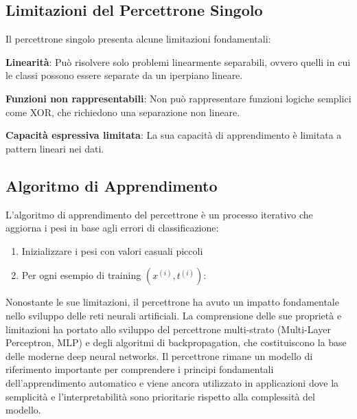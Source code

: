 \subsection{Limitazioni del Percettrone Singolo}
Il percettrone singolo presenta alcune limitazioni fondamentali:
\begin{compactitemize}
\item \textbf{Linearità}: Può risolvere solo problemi linearmente separabili, ovvero quelli in cui le classi possono essere separate da un iperpiano lineare.
\item \textbf{Funzioni non rappresentabili}: Non può rappresentare funzioni logiche semplici come XOR, che richiedono una separazione non lineare.
\item \textbf{Capacità espressiva limitata}: La sua capacità di apprendimento è limitata a pattern lineari nei dati.
\end{compactitemize}


\subsection{Algoritmo di Apprendimento}
L'algoritmo di apprendimento del percettrone è un processo iterativo che aggiorna i pesi in base agli errori di classificazione:
\begin{enumerate}
\item Inizializzare i pesi con valori casuali piccoli
\item Per ogni esempio di training $(x^{(i)}, t^{(i)})$:
\end{enumerate}

Nonostante le sue limitazioni, il percettrone ha avuto un impatto fondamentale nello sviluppo delle reti neurali artificiali. La comprensione delle sue proprietà e limitazioni ha portato allo sviluppo del percettrone multi-strato (Multi-Layer Perceptron, MLP) e degli algoritmi di backpropagation, che costituiscono la base delle moderne deep neural networks. Il percettrone rimane un modello di riferimento importante per comprendere i principi fondamentali dell'apprendimento automatico e viene ancora utilizzato in applicazioni dove la semplicità e l'interpretabilità sono prioritarie rispetto alla complessità del modello.

